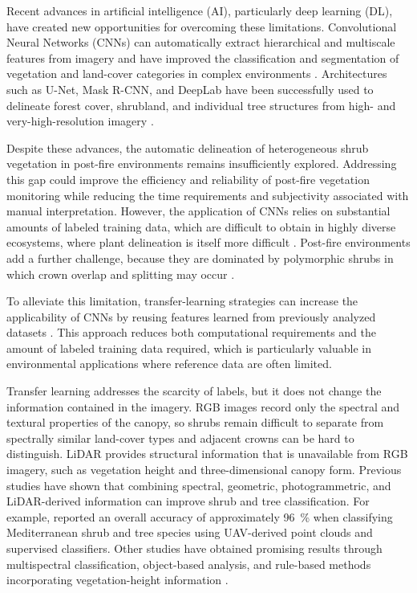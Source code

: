 \documentclass[12pt,a4paper]{article}
\begin{document}
Recent advances in artificial intelligence (AI), particularly deep learning (DL), have created new opportunities for overcoming these limitations. Convolutional Neural Networks (CNNs) can automatically extract hierarchical and multiscale features from imagery and have improved the classification and segmentation of vegetation and land-cover categories in complex environments \citep{abdi2020land,kattenborn2021review}. Architectures such as U-Net, Mask R-CNN, and DeepLab have been successfully used to delineate forest cover, shrubland, and individual tree structures from high- and very-high-resolution imagery \citep{he2023improvements,guirado2017deeplearning}.

Despite these advances, the automatic delineation of heterogeneous shrub vegetation in post-fire environments remains insufficiently explored. Addressing this gap could improve the efficiency and reliability of post-fire vegetation monitoring while reducing the time requirements and subjectivity associated with manual interpretation. However, the application of CNNs relies on substantial amounts of labeled training data, which are difficult to obtain in highly diverse ecosystems, where plant delineation is itself more difficult \citep{zhang2020identifying}. Post-fire environments add a further challenge, because they are dominated by polymorphic shrubs in which crown overlap and splitting may occur \citep{dong2019progressive}.

To alleviate this limitation, transfer-learning strategies can increase the applicability of CNNs by reusing features learned from previously analyzed datasets \citep{tan2018survey}. This approach reduces both computational requirements and the amount of labeled training data required, which is particularly valuable in environmental applications where reference data are often limited.

Transfer learning addresses the scarcity of labels, but it does not change the information contained in the imagery. RGB images record only the spectral and textural properties of the canopy, so shrubs remain difficult to separate from spectrally similar land-cover types and adjacent crowns can be hard to distinguish. LiDAR provides structural information that is unavailable from RGB imagery, such as vegetation height and three-dimensional canopy form. Previous studies have shown that combining spectral, geometric, photogrammetric, and LiDAR-derived information can improve shrub and tree classification. For example, \citet{carbonellrivera2022classification} reported an overall accuracy of approximately \qty{96}{\percent} when classifying Mediterranean shrub and tree species using UAV-derived point clouds and supervised classifiers. Other studies have obtained promising results through multispectral classification, object-based analysis, and rule-based methods incorporating vegetation-height information \citep{uyeda2020vegetation,zahidi2015object}.
\end{document}
